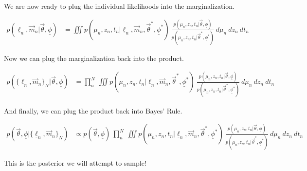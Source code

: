 \documentclass[12pt, onecolumn]{emulateapj}
\newcommand{\textul}{\underline}
\begin{document}
We are now ready to plug the individual likelihoods into the marginalization.

\begin{align}
p(\textul{\ell}_{n}, \vec{m}_{n} | \vec{\theta}, \textul{\phi}) &= \iiint p(\mu_{n}, z_{n}, t_{n} | \textul{\ell}_{n}, \vec{m}_{n}, \vec{\theta}^{*}, \textul{\phi}^{*})\ \frac{p(\mu_{n}, z_{n}, t_{n} | \vec{\theta}, \textul{\phi})}{p(\mu_{n}, z_{n}, t_{n} | \vec{\theta}^{*}, \textul{\phi}^{*})}\ d\mu_{n}\ dz_{n}\ dt_{n}
\end{align}

Now we can plug the marginalization back into the product.

\begin{align}
p(\{\textul{\ell}_{n}, \vec{m}_{n}\}_{N} | \vec{\theta}, \textul{\phi}) &= \prod_{n}^{N}\ \iiint p(\mu_{n}, z_{n}, t_{n} | \textul{\ell}_{n}, \vec{m}_{n}, \vec{\theta}^{*}, \textul{\phi}^{*})\ \frac{p(\mu_{n}, z_{n}, t_{n} | \vec{\theta}, \textul{\phi})}{p(\mu_{n}, z_{n}, t_{n} | \vec{\theta}^{*}, \textul{\phi}^{*})}\ d\mu_{n}\ dz_{n}\ dt_{n}
\end{align}

And finally, we can plug the product back into Bayes' Rule.

\begin{align}
p(\vec{\theta}, \textul{\phi} | \{\textul{\ell}_{n}, \vec{m}_{n}\}_{N}) &\propto p(\vec{\theta}, \textul{\phi})\ \prod_{n}^{N}\ \iiint p(\mu_{n}, z_{n}, t_{n} | \textul{\ell}_{n}, \vec{m}_{n}, \vec{\theta}^{*}, \textul{\phi}^{*})\ \frac{p(\mu_{n}, z_{n}, t_{n} | \vec{\theta}, \textul{\phi})}{p(\mu_{n}, z_{n}, t_{n} | \vec{\theta}^{*}, \textul{\phi}^{*})}\ d\mu_{n}\ dz_{n}\ dt_{n}
\end{align}

This is the posterior we will attempt to sample!
\end{document}
